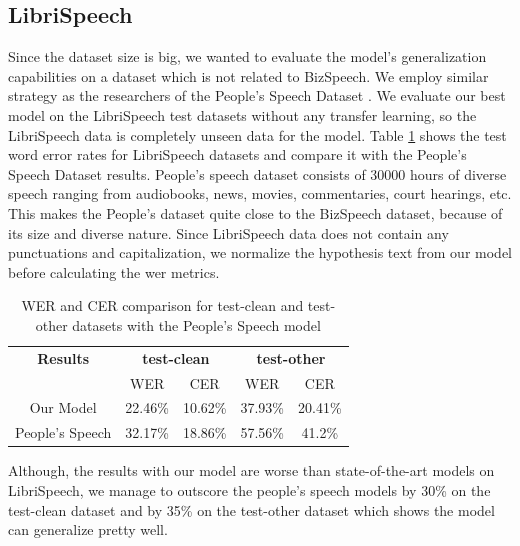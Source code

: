 \subsection{LibriSpeech}
Since the dataset size is big, we wanted to evaluate the model's generalization capabilities on  a dataset which is not related to BizSpeech. We employ similar strategy as the researchers of the People's Speech Dataset \cite{Galvez2021TheUsage}. We evaluate our best model on the LibriSpeech\cite{Panayotov2015Librispeech:Books} test datasets without any transfer learning, so the LibriSpeech data is completely unseen data for the model. Table \ref{table:libri} shows the test word error rates for LibriSpeech datasets and compare it with the People's Speech Dataset results. People's speech dataset consists of 30000 hours of diverse speech ranging from audiobooks, news, movies, commentaries, court hearings, etc. This makes the People's dataset quite close to the BizSpeech dataset, because of its size and diverse nature. Since LibriSpeech data does not contain any punctuations and capitalization, we normalize the hypothesis text from our model before calculating the \acrshort{wer} metrics. 

\begin{table}[ht]
\centering
\begin{tabular}{c | c c | c c }
\hline
\textbf{Results} & \multicolumn{2}{c|}{\textbf{test-clean}} & \multicolumn{2}{c}{\textbf{test-other}}\\\cline{2-5}
    & WER & CER & WER & CER\\
 \hline
  Our Model & 22.46\% & 10.62\% & 37.93\% & 20.41\%\\
  People's Speech \cite{Galvez2021TheUsage} & 32.17\% & 18.86\% & 57.56\% & 41.2\% \\
 \hline
\end{tabular}
\caption{\label{table:libri} WER and CER comparison for test-clean and test-other datasets with the People's Speech model}
\end{table}

Although, the results with our model are worse than state-of-the-art models on LibriSpeech, we manage to outscore the people's speech models by 30\% on the test-clean dataset and by 35\% on the test-other dataset which shows the model can generalize pretty well.
 
